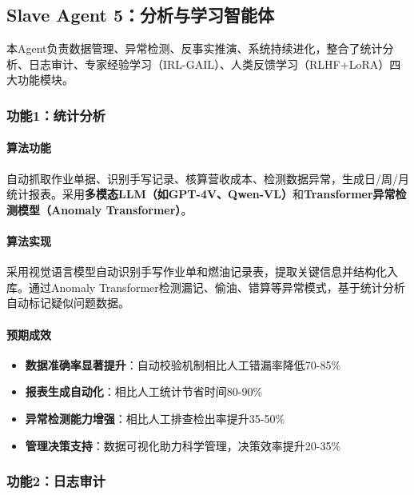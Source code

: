 \documentclass[12pt,a4paper]{article}
\begin{document}
\subsection{Slave Agent 5：分析与学习智能体}

本Agent负责数据管理、异常检测、反事实推演、系统持续进化，整合了统计分析、日志审计、专家经验学习（IRL-GAIL）、人类反馈学习（RLHF+LoRA）四大功能模块。

\subsubsection{功能1：统计分析}

\paragraph{算法功能}

自动抓取作业单据、识别手写记录、核算营收成本、检测数据异常，生成日/周/月统计报表。采用\textbf{多模态LLM（如GPT-4V、Qwen-VL）}和\textbf{Transformer异常检测模型（Anomaly Transformer）}。

\paragraph{算法实现}

采用视觉语言模型自动识别手写作业单和燃油记录表，提取关键信息并结构化入库。通过Anomaly Transformer检测漏记、偷油、错算等异常模式，基于统计分析自动标记疑似问题数据。

\paragraph{预期成效}

\begin{itemize}[leftmargin=*]
    \item[\checkmark] \textbf{数据准确率显著提升}：自动校验机制相比人工错漏率降低70-85\%
    \item[\checkmark] \textbf{报表生成自动化}：相比人工统计节省时间80-90\%
    \item[\checkmark] \textbf{异常检测能力增强}：相比人工排查检出率提升35-50\%
    \item[\checkmark] \textbf{管理决策支持}：数据可视化助力科学管理，决策效率提升20-35\%
\end{itemize}

\subsubsection{功能2：日志审计}
\end{document}
